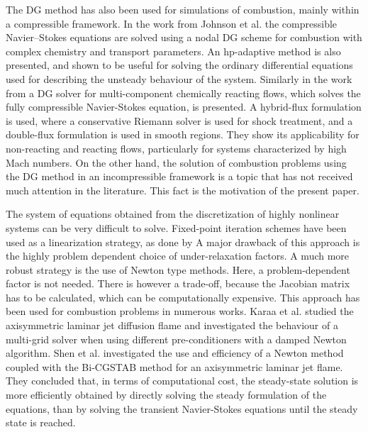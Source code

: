 The DG method has also been used for simulations of combustion, mainly within a compressible framework. In the work from Johnson et al. \textcite{johnsonConservativeDiscontinuousGalerkin2020} the compressible Navier--Stokes equations are solved using a nodal DG scheme for combustion with complex chemistry and transport parameters. An hp-adaptive method is also presented, and shown to be useful for solving the ordinary differential equations used for describing the unsteady behaviour of the system.  Similarly in the work from \textcite{lvHighorderDiscontinuousGalerkin2017} a DG solver for multi-component chemically reacting flows, which solves the fully compressible Navier-Stokes equation, is presented. A hybrid-flux formulation is used, where a conservative Riemann solver is used for shock treatment, and a double-flux formulation is used in smooth regions. They show its applicability for non-reacting and reacting flows, particularly for systems characterized by high Mach numbers. On the other hand, the solution of combustion problems using the DG method in an incompressible framework is a topic that has not received much attention in the literature. This fact is the motivation of the present paper.

The system of equations obtained from the discretization of highly nonlinear systems  can be very difficult to solve. Fixed-point iteration schemes have been used as a linearization strategy, as done by \textcite{kleinHighorderDiscontinuousGalerkin2016} A major drawback of this approach is the highly problem dependent choice of under-relaxation factors. A much more robust strategy is the use of Newton type methods. Here, a problem-dependent factor is not needed. There is however a trade-off, because the Jacobian matrix has to be calculated, which can be computationally expensive. This approach has been used for combustion problems in numerous works. Karaa et al. \textcite{karaaPreconditionedMultigridSimulation2003} studied the axisymmetric laminar jet diffusion flame and investigated the behaviour of a multi-grid solver when using different pre-conditioners with a damped Newton algorithm. Shen et al. \textcite{shenNewtonMethodSteady2006a} investigated the use  and efficiency of a Newton method coupled with the Bi-CGSTAB method for an axisymmetric laminar jet flame. They concluded that, in terms of computational cost, the steady-state solution  is more efficiently obtained by directly solving the steady formulation of the equations, than by solving the transient Navier-Stokes equations until the steady state is reached.



